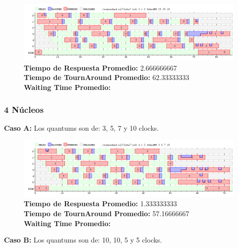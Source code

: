 \documentclass[a4paper]{article}
\begin{document}
		 \begin{figure}[h!]
   \begin{center}
 	\includegraphics[scale=0.5]{imagenes/ej7/3nucleoC.png}
 	\textbf{Tiempo de Respuesta Promedio:} 2.666666667 \\
 	\textbf{Tiempo de TournAround Promedio:} 62.33333333 \\
 	\textbf{Waiting Time Promedio:} \\
   \end{center}
 \end{figure} 
 
 \newpage
	\subsubsection*{4 N\'ucleos}
	
	\textbf{Caso A:}  Los quantums son de: 3, 5, 7 y 10 clocks.
	
		 \begin{figure}[h!]
   \begin{center}
 	\includegraphics[scale=0.5]{imagenes/ej7/4nucleoA.png}
 	\textbf{Tiempo de Respuesta Promedio:} 1.333333333 \\
 	\textbf{Tiempo de TournAround Promedio:} 57.16666667 \\
 	\textbf{Waiting Time Promedio:} \\
   \end{center}
 \end{figure} 
 	
	\textbf{Caso B:}  Los quantums son de: 10, 10, 5 y 5 clocks.
	
\end{document}
